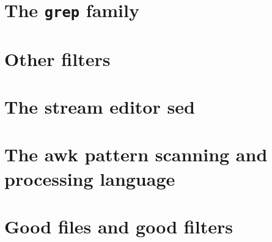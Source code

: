 \section{The \texttt{grep} family}
\section{Other filters}
\section{The stream editor \textbf{sed}}
\section{The \textbf{awk} pattern scanning and processing language}
\section{Good files and good filters}
